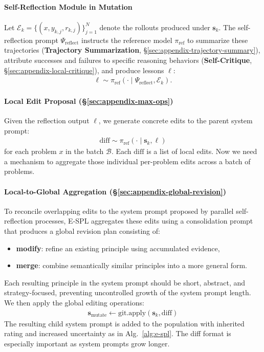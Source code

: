 \documentclass{article}
\theoremstyle{plain}
\theoremstyle{definition}
\theoremstyle{remark}
\begin{document}
\paragraph{Self-Reflection Module in Mutation} Let $\mathcal{E}_k = \{(x,y_{k,j},r_{k,j})\}_{j=1}^N$ denote the rollouts produced under $\mathbf{s}_k$. 
The self-reflection prompt $\Psi_{\text{reflect}}$ instructs the reference model $\pi_{\text{ref}}$ to summarize these trajectories (\textbf{Trajectory Summarization}, \S\ref{sec:appendix-trajectory-summary}), attribute successes and failures to specific reasoning behaviors (\textbf{Self-Critique}, \S\ref{sec:appendix-local-critique}), and produce lessons $\ell$:
\begin{align}
\ell \sim \pi_{\text{ref}}(\cdot \mid \Psi_{\text{reflect}}, \mathcal{E}_k).
\end{align}
\paragraph{Local Edit Proposal (\S\ref{sec:appendix-max-ops})}
Given the reflection output $\ell$, we generate concrete edits to the parent system prompt:
\begin{align}
\mathrm{diff} \sim \pi_{\text{ref}}(\cdot \mid \mathbf{s}_k, \ell)
\end{align}
for each problem $x$ in the batch $\mathcal{B}$. Each $\mathrm{diff}$ is a list of local edits. Now we need a mechanism to aggregate those individual per-problem edits across a batch of problems.

\paragraph{Local-to-Global Aggregation (\S\ref{sec:appendix-global-revision})}
To reconcile overlapping edits to the system prompt proposed by parallel self-reflection processes, E-SPL aggregates these edits using a consolidation prompt that produces a global revision plan consisting of:
\begin{itemize}
    \item \textbf{modify}: refine an existing principle using accumulated evidence,
    \item \textbf{merge}: combine semantically similar principles into a more general form.
\end{itemize}
Each resulting principle in the system prompt should be short, abstract, and strategy-focused, preventing uncontrolled growth of the system prompt length. We then apply the global editing operations:
\begin{align}
    \mathbf{s}_{\text{mutate}} \leftarrow \mathrm{git.apply}(\mathbf{s}_k, \mathrm{diff})
\end{align}
The resulting child system prompt is added to the population with inherited rating and increased uncertainty as in Alg.~\ref{alg:e-spl}. The diff format is especially important as system prompts grow longer.
\end{document}
